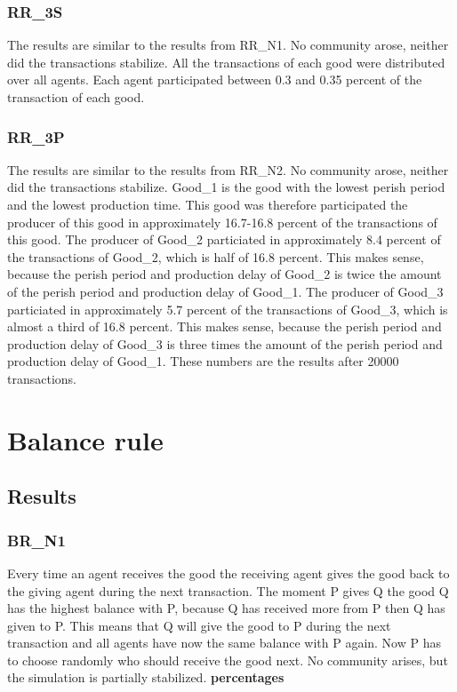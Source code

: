 \documentclass[twoside,openright]{uva-bachelor-thesis}
\begin{document}
\subsubsection{RR\_3S}
The results are similar to the results from RR\_N1. No community arose, neither did the transactions stabilize. All the transactions of each good were distributed over all agents. Each agent participated between 0.3 and 0.35 percent of the transaction of each good.

\subsubsection{RR\_3P}
The results are similar to the results from RR\_N2. No community arose, neither did the transactions stabilize. Good\_1 is the good with the lowest perish period and the lowest production time. This good was therefore participated the producer of this good in approximately 16.7-16.8 percent of the transactions of this good. The producer of Good\_2 particiated in approximately 8.4 percent of the transactions of Good\_2, which is half of 16.8 percent. This makes sense, because the perish period and production delay of Good\_2 is twice the amount of the perish period and production delay of Good\_1. The producer of Good\_3 particiated in approximately 5.7 percent of the transactions of Good\_3, which is almost a third of 16.8 percent. This makes sense, because the perish period and production delay of Good\_3 is three times the amount of the perish period and production delay of Good\_1. 
These numbers are the results after 20000 transactions.

\section{Balance rule}

\subsection{Results}

\subsubsection{BR\_N1}
Every time an agent receives the good the receiving agent gives the good back to the giving agent during the next transaction. The moment P gives Q the good Q has the highest balance with P, because Q has received more from P then Q has given to P. This means that Q will give the good to P during the next transaction and all agents have now the same balance with P again. Now P has to choose randomly who should receive the good next. No community arises, but the simulation is partially stabilized. \textbf{percentages}
\end{document}
